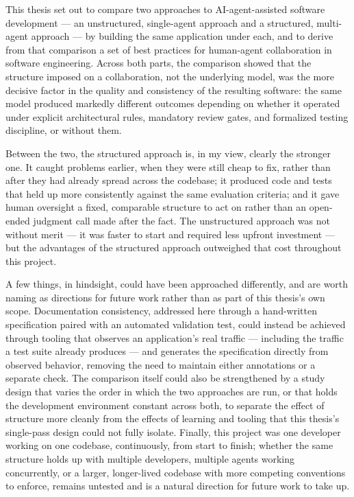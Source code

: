 This thesis set out to compare two approaches to AI-agent-assisted software development --- an unstructured, single-agent approach and a structured, multi-agent approach --- by building the same application under each, and to derive from that comparison a set of best practices for human-agent collaboration in software engineering. Across both parts, the comparison showed that the structure imposed on a collaboration, not the underlying model, was the more decisive factor in the quality and consistency of the resulting software: the same model produced markedly different outcomes depending on whether it operated under explicit architectural rules, mandatory review gates, and formalized testing discipline, or without them.

Between the two, the structured approach is, in my view, clearly the stronger one. It caught problems earlier, when they were still cheap to fix, rather than after they had already spread across the codebase; it produced code and tests that held up more consistently against the same evaluation criteria; and it gave human oversight a fixed, comparable structure to act on rather than an open-ended judgment call made after the fact. The unstructured approach was not without merit --- it was faster to start and required less upfront investment --- but the advantages of the structured approach outweighed that cost throughout this project.

A few things, in hindsight, could have been approached differently, and are worth naming as directions for future work rather than as part of this thesis's own scope. Documentation consistency, addressed here through a hand-written specification paired with an automated validation test, could instead be achieved through tooling that observes an application's real traffic --- including the traffic a test suite already produces --- and generates the specification directly from observed behavior, removing the need to maintain either annotations or a separate check. The comparison itself could also be strengthened by a study design that varies the order in which the two approaches are run, or that holds the development environment constant across both, to separate the effect of structure more cleanly from the effects of learning and tooling that this thesis's single-pass design could not fully isolate. Finally, this project was one developer working on one codebase, continuously, from start to finish; whether the same structure holds up with multiple developers, multiple agents working concurrently, or a larger, longer-lived codebase with more competing conventions to enforce, remains untested and is a natural direction for future work to take up.
